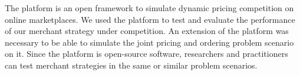 The \pricewars platform is an open framework to simulate dynamic pricing competition on online marketplaces.
We used the platform to test and evaluate the performance of our merchant strategy under competition.
An extension of the platform was necessary to be able to simulate the joint pricing and ordering problem scenario on it.
Since the platform is open-source software, researchers and practitioners can test merchant strategies in the same or similar problem scenarios.




